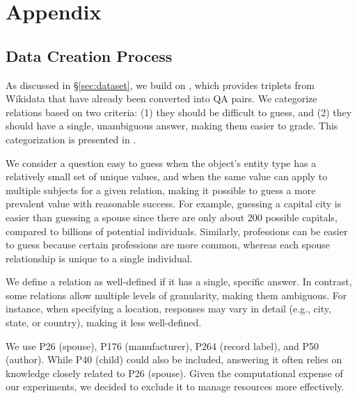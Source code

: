 \appendix
\section{Appendix}


\subsection{Data Creation Process}
\label{sec:data_creation}

As discussed in \S\ref{sec:dataset}, we build on \eq \citep{Entity_Questions}, which provides triplets from Wikidata \citep{Wikidata} that have already been converted into QA pairs. We categorize relations based on two criteria: (1) they should be difficult to guess, and (2) they should have a single, unambiguous answer, making them easier to grade. This categorization is presented in .

We consider a question easy to guess when the object’s entity type has a relatively small set of unique values, and when the same value can apply to multiple subjects for a given relation, making it possible to guess a more prevalent value with reasonable success. For example, guessing a capital city is easier than guessing a spouse since there are only about 200 possible capitals, compared to billions of potential individuals. Similarly, professions can be easier to guess because certain professions are more common, whereas each spouse relationship is unique to a single individual.



We define a relation as well-defined if it has a single, specific answer. In contrast, some relations allow multiple levels of granularity, making them ambiguous. For instance, when specifying a location, responses may vary in detail (e.g., city, state, or country), making it less well-defined.

We use P26 (spouse), P176 (manufacturer), P264 (record label), and P50 (author). While P40 (child) could also be included, answering it often relies on knowledge closely related to P26 (spouse). Given the computational expense of our experiments, we decided to exclude it to manage resources more effectively.


